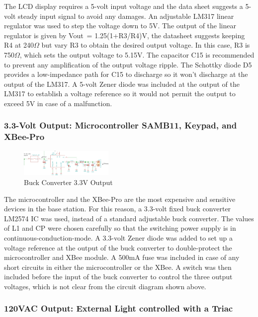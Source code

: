 \documentclass[journal,compsoc]{IEEEtran}
\begin{document}
The LCD display requires a 5-volt input voltage and the data sheet suggests a 5-volt steady input signal to avoid any damages.  An adjustable LM317 linear regulator was used to step the voltage down to 5V.  The output of the linear regulator is given by Vout~= 1.25(1+R3/R4)V, the datasheet suggests keeping R4 at 240$\Omega$ but vary R3 to obtain the desired output voltage.  In this case, R3 is 750$\Omega$, which sets the output voltage to 5.15V.  The capacitor C15 is recommended to prevent any amplification of the output voltage ripple.  The Schottky diode D5 provides a low-impedance path for C15 to discharge so it won’t discharge at the output of the LM317.  A 5-volt Zener diode was included at the output of the LM317 to establish a voltage reference so it would not permit the output to exceed 5V in case of a malfunction.

\subsubsection {3.3-Volt Output: Microcontroller SAMB11, Keypad, and XBee-Pro}

\begin{figure}[ht]	%
\centering
\includegraphics[width=0.4\textwidth]{Buck.png}
\caption{ Buck Converter 3.3V Output }
\label{PConverter}
\end{figure}

The microcontroller and the XBee-Pro are the most expensive and sensitive devices in the base station. For this reason, a 3.3-volt fixed buck converter LM2574 IC was used, instead of a standard adjustable buck converter.  The values of L1 and CP were chosen carefully so that the switching power supply is in continuous-conduction-mode.  A 3.3-volt Zener diode was added to set up a voltage reference at the output of the buck converter to double-protect the microcontroller and XBee module.  A 500mA fuse was included in case of any short circuits in either the microcontroller or the XBee.  A switch was then included before the input of the buck converter to control the three output voltages, which is not clear from the circuit diagram shown above.

\subsubsection{120VAC Output: External Light controlled with a Triac}
\end{document}
